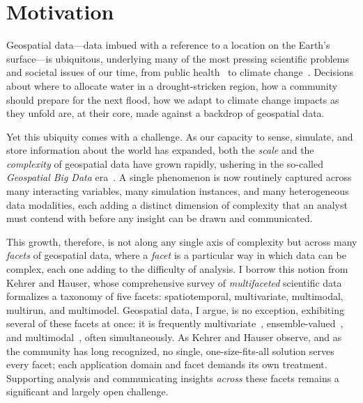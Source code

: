 \providecommand{\fix}[1]{\textbf{#1}}

\section{Motivation}
%
Geospatial data---data imbued with a reference to a location on the Earth's surface---is ubiquitous, underlying many of the most pressing scientific problems and societal issues of our time, from public health~\cite{zhang_visualization_2023} to climate change~\cite{eyring2016overview}.
%
Decisions about where to allocate water in a drought-stricken region, how a community should prepare for the next flood, how we adapt to climate change impacts as they unfold are, at their core, made against a backdrop of geospatial data.

Yet this ubiquity comes with a challenge.
%
As our capacity to sense, simulate, and store information about the world has expanded, both the \emph{scale} and the \emph{complexity} of geospatial data have grown rapidly, ushering in the so-called \emph{Geospatial Big Data} era~\cite{wu_geosptial_2024}.
%
A single phenomenon is now routinely captured across many interacting variables, many simulation instances, and many heterogeneous data modalities, each adding a distinct dimension of complexity that an analyst must contend with before any insight can be drawn and communicated.
%

This growth, therefore, is not along any single axis of complexity but across many \textit{facets} of geospatial data, where a \emph{facet} is a particular way in which data can be complex, each one adding to the difficulty of analysis.
%
I borrow this notion from Kehrer and Hauser, whose comprehensive survey of \emph{multifaceted} scientific data~\cite{kehrer_visualization_2013} formalizes a taxonomy of five facets: spatiotemporal, multivariate, multimodal, multirun, and multimodel.
%
Geospatial data, I argue, is no exception, exhibiting several of these facets at once: it is frequently multivariate~\cite{strode2020bivariate}, ensemble-valued~\cite{kehrer2013visualization}, and multimodal~\cite{wu_geosptial_2024}, often simultaneously.
%
As Kehrer and Hauser observe, and as the community has long recognized, no single, one-size-fits-all solution serves every facet; each application domain and facet demands its own treatment.
%
Supporting analysis and communicating insights \textit{across} these facets remains a significant and largely open challenge.

